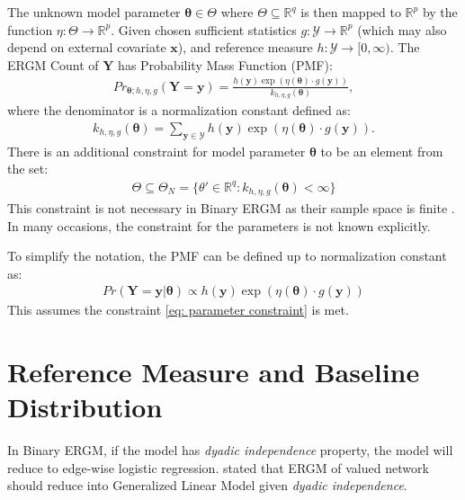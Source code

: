 \documentclass[12pt,a4paper,twoside,openany]{book}\usepackage[]{graphicx}\usepackage[]{color}
\begin{document}
The unknown model parameter $\bm{\theta} \in \Theta$ where $\Theta \subseteq \mathbb{R}^{q}$ is then mapped to $\mathbb{R}^p$ by the function $\eta:\Theta \to \mathbb{R}^p$. Given chosen sufficient statistics $g:\mathcal{Y} \to \mathbb{R}^{p}$ (which may also depend on external covariate $\bm{x}$), and reference measure $h:\mathcal{Y} \to [0,\infty)$. The ERGM Count of $\bm{Y}$ has Probability Mass Function (PMF):
\begin{align}
Pr_{\bm{\theta};h,\eta,g}(\bm{Y}=\bm{y})=\frac{h(\bm{y})\exp(\eta(\bm{\theta})\cdot g(\bm{y}))}{k_{h,\eta,g}(\bm{\theta})},
\end{align}
where the denominator is a normalization constant defined as:
\begin{align}
k_{h,\eta,g}(\bm{\theta}) = \sum_{\bm{y} \in \mathcal{Y}}h(\bm{y})\exp(\eta(\bm{\theta})\cdot g(\bm{y})).
\end{align}
There is an additional constraint for model parameter $\bm{\theta}$ to be an element from the set:
\begin{align} \label{eq: parameter constraint}
\Theta \subseteq \Theta_{N}=\{\theta' \in \mathbb{R}^q: k_{h,\eta,g}(\bm{\theta}) < \infty\}
\end{align}
This constraint is not necessary in Binary ERGM as their sample space is finite \citep{countergmdefined}. 
In many occasions, the constraint for the parameters is not known explicitly. 

To simplify the notation, the PMF can be defined up to normalization constant as:
\begin{align}
Pr(\bm{Y}=\bm{y}|\bm{\theta}) \propto h(\bm{y})\exp(\eta(\bm{\theta})\cdot g(\bm{y}))
\end{align}
This assumes the constraint \ref{eq: parameter constraint} is met.

\section{Reference Measure and Baseline Distribution}
In Binary ERGM, if the model has \textit{dyadic independence} property, the model will reduce to edge-wise logistic regression. 
\citet{countergmdefined} stated that ERGM of valued network should reduce into Generalized Linear Model given \textit{dyadic independence}.
\end{document}
